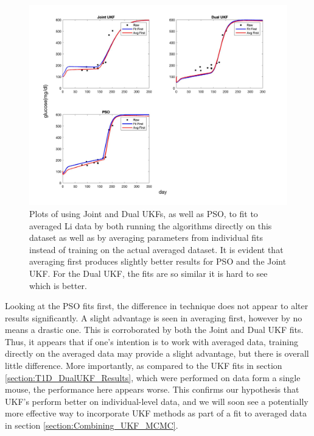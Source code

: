 \documentclass{article}
\begin{document}
\begin{figure}[H]
    \centering
    \includegraphics[width=15cm]{Comparison_Figures/FitFirst_vs_AvgFirst_PSOUKF.jpg}
    \caption{Plots of using Joint and Dual UKFs, as well as PSO, to fit to averaged Li data by both running the algorithms directly on this dataset as well as by averaging parameters from individual fits instead of training on the actual averaged dataset. It is evident that averaging first produces slightly better results for PSO and the Joint UKF. For the Dual UKF, the fits are so similar it is hard to see which is better.}
    \label{fig:Results_FitFirstAvgFirst_Comparison}
\end{figure}
Looking at the PSO fits first, the difference in technique does not appear to alter results significantly. A slight advantage is seen in averaging first, however by no means a drastic one. This is corroborated by both the Joint and Dual UKF fits. Thus, it appears that if one's intention is to work with averaged data, training directly on the averaged data may provide a slight advantage, but there is overall little difference. More importantly, as compared to the UKF fits in section \ref{section:T1D_DualUKF_Results}, which were performed on data form a single mouse, the performance here appears worse. This confirms our hypothesis that UKF's perform better on individual-level data, and we will soon see a potentially more effective way to incorporate UKF methods as part of a fit to averaged data in section \ref{section:Combining_UKF_MCMC}.
\end{document}
